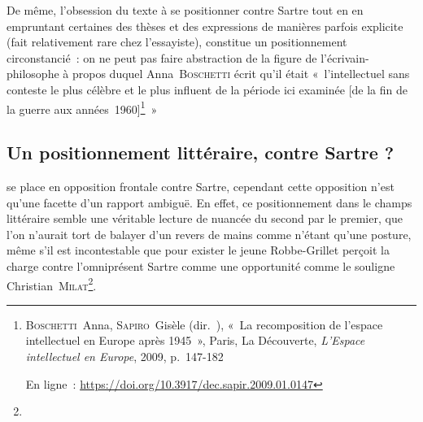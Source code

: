 \documentclass[12pt, a4paper]{article}
\begin{document}

De même, l'obsession du texte à se positionner contre Sartre tout en en empruntant certaines des thèses et des expressions de manières parfois explicite (fait relativement rare chez l'essayiste), constitue un positionnement circonstancié~: on ne peut pas faire abstraction de la figure de l'écrivain-philosophe à propos duquel Anna~\textsc{Boschetti} écrit qu'il était «~l’intellectuel sans conteste le plus célèbre et le plus influent de la période ici examinée [de la fin de la guerre aux années~1960]\footnote{\textsc{Boschetti}~Anna, \textsc{Sapiro}~Gisèle (dir.~), «~La recomposition de l'espace intellectuel en Europe après 1945~», Paris, La Découverte, \textit{L'Espace intellectuel en Europe}, 2009, p.~147-182

En ligne~: \href{https://doi.org/10.3917/dec.sapir.2009.01.0147}{https://doi.org/10.3917/dec.sapir.2009.01.0147}}~»

\subsection{Un positionnement littéraire, contre Sartre ?}
\label{vsSartre}

\robbe{} se place en opposition frontale contre Sartre, cependant cette opposition n'est qu'une facette d'un rapport ambiguë. En effet, ce positionnement dans le champs littéraire semble une véritable lecture de nuancée du second par le premier, que l'on n'aurait tort de balayer d'un revers de mains comme n'étant qu'une posture, même s'il est incontestable que pour exister le jeune Robbe-Grillet perçoit la charge contre l'omniprésent Sartre comme une opportunité comme le souligne Christian~\textsc{Milat}\footnote{}.
\end{document}
